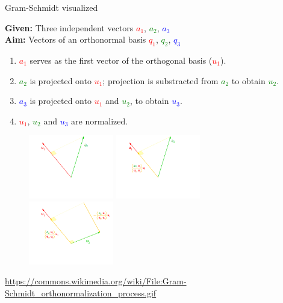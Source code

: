 \documentclass[11pt,compress,t,notes=noshow, xcolor=table]{beamer}
\begin{document}
\begin{vbframe}{Gram-Schmidt visualized}
\framebreak

\begin{scriptsize}

\textbf{Given:} Three independent vectors \textcolor{red}{$a_1$}, \textcolor{green}{$a_2$}, \textcolor{blue}{$a_3$} \\
\textbf{Aim:} Vectors of an orthonormal basis \textcolor{red}{$q_1$}, \textcolor{green}{$q_2$}, \textcolor{blue}{$q_3$}

\begin{enumerate}
  \item<2-> \textcolor{red}{$a_1$} serves as the first vector of the orthogonal basis (\textcolor{red}{$u_1$}).
  \item \textcolor{green}{$a_2$} is projected onto \textcolor{red}{$u_1$}; projection is substracted from \textcolor{green}{$a_2$}
        to obtain \textcolor{green}{$u_2$}.
  \item<3-> \textcolor{blue}{$a_3$} is projected onto \textcolor{red}{$u_1$} and \textcolor{green}{$u_2$},
        to obtain \textcolor{blue}{$u_3$}.
  \item<4-> \textcolor{red}{$u_1$}, \textcolor{green}{$u_2$} and \textcolor{blue}{$u_3$} are normalized.
\end{enumerate}

\end{scriptsize}

\begin{figure}
  \centering
  \includegraphics[width=0.33\textwidth]{figure_man/frame_016_delay-3s.png}
  \includegraphics[width=0.33\textwidth]{figure_man/frame_019_delay-3s.png}
  \includegraphics[width=0.33\textwidth]{figure_man/frame_039_delay-4s.png}
\end{figure}
\tiny{\url{https://commons.wikimedia.org/wiki/File:Gram-Schmidt_orthonormalization_process.gif}}


\end{vbframe}
\end{document}
